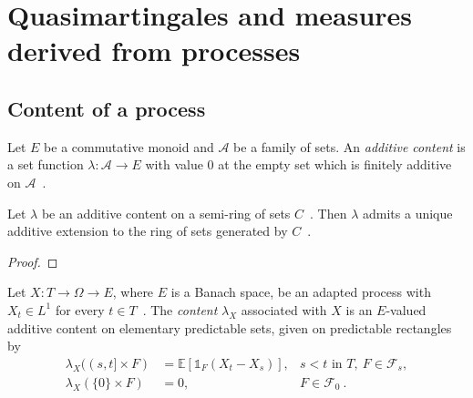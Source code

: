 \chapter{Quasimartingales and measures derived from processes}


\section{Content of a process}

\begin{definition}\label{def:addContent}
  \mathlibok
  Let $E$ be a commutative monoid and $\mathcal{A}$ be a family of sets.
  An \emph{additive content} is a set function $\lambda : \mathcal{A} \to E$
  with value $0$ at the empty set
  which is finitely additive on $\mathcal{A}$~.
\end{definition}

\begin{lemma}\label{lem:addContent_extension}
  \mathlibok
  Let $\lambda$ be an additive content on a semi-ring of sets $C$~.
  Then $\lambda$ admits a unique additive extension to the ring of sets generated by $C$~.
\end{lemma}

\begin{proof}\leanok
\end{proof}

\begin{definition}\label{def:contentAssociatedWithProcess}
Let $X : T \to \Omega \to E$, where $E$ is a Banach space,
 be an adapted process with $X_t \in L^1$ for every $t \in T$~.
The \emph{content} $\lambda_X$ associated with $X$
is an $E$-valued additive content on
elementary predictable sets,
given on predictable rectangles by
\begin{align*}
  \lambda_X((s, t] \times F) &= \mathbb{E}[\mathbb{1}_F (X_t - X_s)],
  & s < t \text{ in } T,\ F \in \mathcal{F}_s,
  \\
  \lambda_X(\{0\} \times F) &= 0,
  & F \in \mathcal{F}_0
  \: .
\end{align*}
\end{definition}

